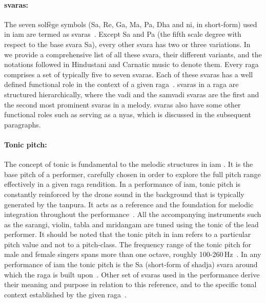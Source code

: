 \paragraph{\Glspl{svara}:} The seven solf\`{e}ge symbols (Sa, Re, Ga, Ma, Pa, Dha and \gls{ni}, in short-form) used in \gls{iam} are termed as \glspl{svara}~\citep{Danielou2010,Bagchee1998}. Except Sa and Pa (the fifth scale degree with respect to the base \gls{svara} Sa), every other \gls{svara} has two or three variations. In~ we provide a comprehensive list of all these \gls{svara}, their different variants, and the notations followed in Hindustani and Carnatic music to denote them. Every \gls{raga} comprises a set of typically five to seven \glspl{svara}. Each of these \glspl{svara} has a well defined functional role in the context of a given \gls{raga}~\citep{Viswanathan2004}. \Glspl{svara} in a \gls{raga} are structured hierarchically, where the \gls{vadi} and the \gls{samvadi} \glspl{svara} are the first and the second most prominent \glspl{svara} in a melody. \Glspl{svara} also have some other functional roles such as serving as a \gls{nyas}, which is discussed in the subsequent paragraphs. 

\paragraph{Tonic pitch:} The concept of tonic is fundamental to the melodic structures in \gls{iam} \citep{Viswanathan2004,Danielou2010}. It is the base pitch of a performer, carefully chosen in order to explore the full pitch range effectively in a given \gls{raga} rendition. In a performance of \gls{iam}, tonic pitch is constantly reinforced by the drone sound in the background that is typically generated by the \gls{tanpura}. It acts as a reference and the foundation for melodic integration throughout the performance~\citep{Deva1980}. All the accompanying instruments such as the \gls{sarangi}, violin, \gls{tabla} and \gls{mridangam} are tuned using the tonic of the lead performer. It should be noted that the tonic pitch in \gls{iam} refers to a particular pitch value and not to a pitch-class. The frequency range of the tonic pitch for male and female singers spans more than one octave, roughly 100-260\,Hz~\citep{Sengupta2005b}. In any performance of \gls{iam} the tonic pitch is the Sa (short-form of \gls{shadja}) \gls{svara} around which the \gls{raga} is built upon~\citep{Danielou2010,Bagchee1998}. Other set of \glspl{svara} used in the performance derive their meaning and purpose in relation to this reference, and to the specific tonal context established by the given \gls{raga}~\citep{Deva1980}. 


